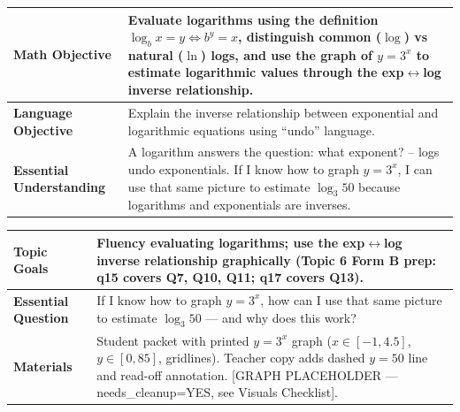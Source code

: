 \documentclass[11pt]{article}
\newcommand{\lessonrow}[2]{\textbf{#1} & #2 \\ \hline}
\begin{document}

{\small
\renewcommand{\arraystretch}{1.25}
\noindent\begin{tabular}{|p{1.8in}|p{4.8in}|}
\hline
\lessonrow{Math Objective}{Evaluate logarithms using the definition \(\log_b x = y \Leftrightarrow b^y = x\), distinguish common (\(\log\)) vs natural (\(\ln\)) logs, and use the graph of \(y=3^x\) to estimate logarithmic values through the exp\(\leftrightarrow\)log inverse relationship.}
\lessonrow{Language Objective}{Explain the inverse relationship between exponential and logarithmic equations using ``undo'' language.}
\lessonrow{Essential Understanding}{A logarithm answers the question: what exponent? -- logs undo exponentials. If I know how to graph \(y = 3^x\), I can use that same picture to estimate \(\log_3 50\) because logarithms and exponentials are inverses.}
\end{tabular}
}

{\small
\renewcommand{\arraystretch}{1.25}
\noindent\begin{tabular}{|p{1.8in}|p{4.8in}|}
\hline
\lessonrow{Topic Goals}{Fluency evaluating logarithms; use the exp\(\leftrightarrow\)log inverse relationship graphically (Topic 6 Form B prep: q15 covers Q7, Q10, Q11; q17 covers Q13).}
\lessonrow{Essential Question}{If I know how to graph \(y = 3^x\), how can I use that same picture to estimate \(\log_3 50\) --- and why does this work?}
\lessonrow{Materials}{Student packet with printed \(y=3^x\) graph (\(x \in [-1, 4.5]\), \(y \in [0, 85]\), gridlines). Teacher copy adds dashed \(y=50\) line and read-off annotation. [GRAPH PLACEHOLDER --- needs\_cleanup=YES, see Visuals Checklist].}
\end{tabular}
}
\end{document}
